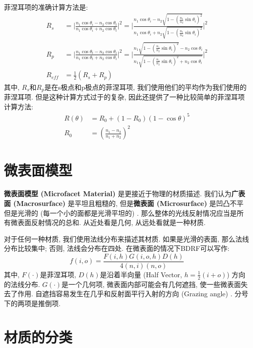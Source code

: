 菲涅耳项的准确计算方法是: 
\begin{equation}
	\begin{split}
		R_s&= \lvert\frac{n_1\cos\theta_i-n_2\cos\theta_t}{n_1\cos\theta_i+n_2\cos\theta_t}\rvert^2 = \lvert{\frac{n_1\cos\theta_i-n_2\sqrt{1-(\frac{n_1}{n_2}\sin\theta_i)^2}}{n_1\cos\theta_i+n_2\sqrt{1-(\frac{n_1}{n_2}\sin\theta_i)^2}}}\rvert^2\\
		R_p&= \lvert\frac{n_1\cos\theta_t-n_2\cos\theta_i}{n_1\cos\theta_t+n_2\cos\theta_i}\rvert^2 = \lvert{\frac{n_1\sqrt{1-(\frac{n_1}{n_2}\sin\theta_i)^2}-n_2\cos\theta_i}{n_1\sqrt{1-(\frac{n_1}{n_2}\sin\theta_i)^2+n_2\cos\theta_i}}}\rvert^2\\
		R_{eff}&=\frac{1}{2}(R_s+R_p)
	\end{split}
\end{equation}
其中, $R_s$和$R_p$是在s极点和p极点的菲涅耳项, 我们使用他们的平均作为我们使用的菲涅耳项. 但是这种计算方式过于的复杂, 因此还提供了一种比较简单的菲涅耳项计算方法: 
\begin{equation}
	\begin{split}
		R(\theta)&=R_0+(1-R_0)(1-\cos\theta)^5\\
		R_0&=(\frac{n_1-n_2}{n_1+n_2})^2
	\end{split}
\end{equation}

\section{微表面模型}

\textbf{微表面模型 (Microfacet Material) }是更接近于物理的材质描述. 我们认为\textbf{广表面 (Macrosurface) }是平坦且粗糙的, 但是\textbf{微表面 (Microsurface) }是凹凸不平但是光滑的 (每一个小的面都是光滑平坦的) . 那么整体的光线反射情况应当是所有微表面反射情况的总和. 从近处看是几何, 从远处看就是一种材质. 

对于任何一种材质, 我们使用法线分布来描述其材质. 如果是光滑的表面, 那么法线分布比较集中; 否则, 法线会分布在四处. 在微表面的情况下BDRF可以写作: 
\begin{equation}
	f(i,o)=\frac{F(i,h)G(i,o,h)D(h)}{4(n,i)(n,o)}
\end{equation}
其中, $F(\cdot)$是菲涅耳项, $D(h)$是沿着半向量 (Half Vector, $h=\frac{1}{2}(i+o)$) 方向的法线分布. $G(\cdot)$是一个几何项, 微表面内部可能会有几何遮挡, 使一些微表面失去了作用. 自遮挡容易发生在几乎和反射面平行入射的方向 (Grazing angle) . 分号下的两项是推倒项. 

\section{材质的分类}

